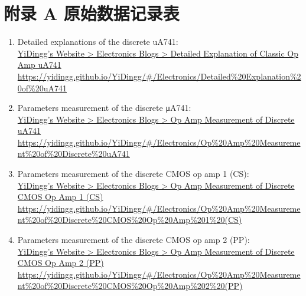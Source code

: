 \documentclass[UTF8]{article}
\begin{document}
\newpage
\section*{附录 A\hspace*{20pt} 原始数据记录表}
\thispagestyle{fancy} 

\begin{enumerate}

\item Detailed explanations of the discrete uA741:
\href{https://yidingg.github.io/YiDingg/#/Electronics/Detailed\%20Explanation\%20of\%20uA741
}{ %
\\
YiDingg's Website > Electronics Blogs > Detailed Explanation of Classic Op Amp uA741\\
{\color{gray}\small https://yidingg.github.io/YiDingg/\#/Electronics/Detailed\%20Explanation\%20of\%20uA741}
}

\item Parameters measurement of the discrete μA741:
\href{https://yidingg.github.io/YiDingg/#/Electronics/Op\%20Amp\%20Measurement\%20of\%20Discrete\%20uA741
}{ %
\\
YiDingg's Website > Electronics Blogs > Op Amp Measurement of Discrete uA741\\
{\color{gray}\small https://yidingg.github.io/YiDingg/\#/Electronics/Op\%20Amp\%20Measurement\%20of\%20Discrete\%20uA741}
}

\item Parameters measurement of the discrete CMOS op amp 1 (CS):
\href{https://yidingg.github.io/YiDingg/#/Electronics/Op\%20Amp\%20Measurement\%20of\%20Discrete\%20CMOS\%20Op\%20Amp\%201\%20(CS)
}{ %
\\
YiDingg's Website > Electronics Blogs > Op Amp Measurement of Discrete CMOS Op Amp 1 (CS)\\
{\color{gray}\footnotesize https://yidingg.github.io/YiDingg/\#/Electronics/Op\%20Amp\%20Measurement\%20of\%20Discrete\%20CMOS\%20Op\%20Amp\%201\%20(CS)}
}

\item Parameters measurement of the discrete CMOS op amp 2 (PP):
\href{https://yidingg.github.io/YiDingg/#/Electronics/Op\%20Amp\%20Measurement\%20of\%20Discrete\%20CMOS\%20Op\%20Amp\%202\%20(PP)
}{ %
\\
YiDingg's Website > Electronics Blogs > Op Amp Measurement of Discrete CMOS Op Amp 2 (PP)\\
{\color{gray}\footnotesize https://yidingg.github.io/YiDingg/\#/Electronics/Op\%20Amp\%20Measurement\%20of\%20Discrete\%20CMOS\%20Op\%20Amp\%202\%20(PP)}
}


\end{enumerate}
\end{document}
